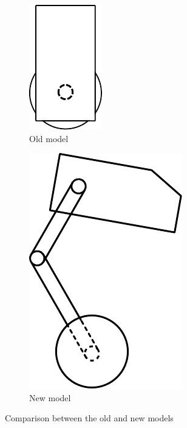 \begin{figure}[h]
	\centering
	\begin{subfigure}[t]{0.45\textwidth}
		\centering
		\includegraphics[height=0.7\textwidth]{Old model}
		\caption{Old model}
		\label{fig:Old model}
	\end{subfigure}
	\begin{subfigure}[t]{0.45\textwidth}
		\centering
		\includegraphics[height=0.7\textwidth]{New model}
		\caption{New model}
		\label{fig:New model}
	\end{subfigure}
	\caption{Comparison between the old and new models}
	\label{fig:Comparison between the old and new models}
\end{figure}

